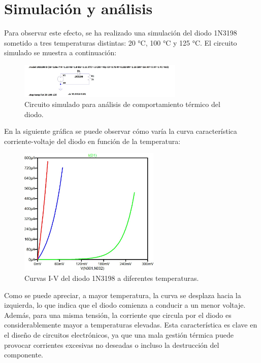 \documentclass[chaptersright]{informeutn}
\begin{document}
  \section{Simulación y análisis}
  
    Para observar este efecto, se ha realizado una simulación del diodo 1N3198 sometido a tres temperaturas distintas: 
    20 °C, 100 °C y 125 °C. El circuito simulado se muestra a continuación:
    
    \begin{figure}[H]
        \centering
        \includegraphics[width=0.7\textwidth]{pictures/comparacion_temperatura_circuito.jpeg}
        \caption{Circuito simulado para análisis de comportamiento térmico del diodo.}
    \end{figure}
    
    En la siguiente gráfica se puede observar cómo varía la curva característica corriente-voltaje del diodo en función de
    la temperatura:
    
    \begin{figure}[H]
        \centering
        \includegraphics[width=0.6\textwidth]{pictures/comparacion_temperatura_grafico.jpeg}
        \caption{Curvas I-V del diodo 1N3198 a diferentes temperaturas.}
    \end{figure}
    
    Como se puede apreciar, a mayor temperatura, la curva se desplaza hacia la izquierda, lo que indica que el diodo
    comienza a conducir a un menor voltaje. Además, para una misma tensión, la corriente que circula por el diodo es
    considerablemente mayor a temperaturas elevadas. Esta característica es clave en el diseño de circuitos electrónicos, 
    ya que una mala gestión térmica puede provocar corrientes excesivas no deseadas o incluso la destrucción del componente.
\end{document}
